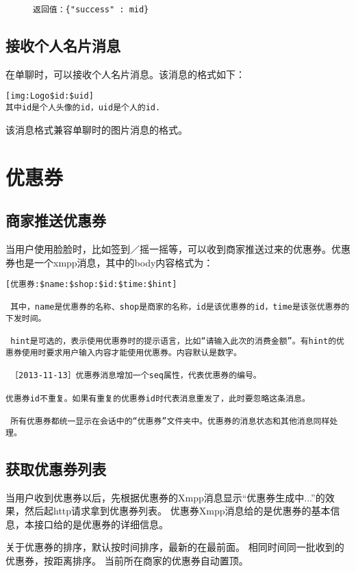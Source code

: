 \begin{figure}[H]
\begin{verbatim}
返回值：{"success" : mid}
\end{verbatim}
\end{figure}


\subsection{接收个人名片消息}
在单聊时，可以接收个人名片消息。该消息的格式如下：
\begin{verbatim}
[img:Logo$id:$uid]
其中id是个人头像的id，uid是个人的id.
\end{verbatim}
该消息格式兼容单聊时的图片消息的格式。


\section{优惠券}

\subsection{商家推送优惠券}
当用户使用脸脸时，比如签到／摇一摇等，可以收到商家推送过来的优惠券。优惠券也是一个xmpp消息，其中的body内容格式为：

\begin{verbatim}
[优惠券:$name:$shop:$id:$time:$hint]

 其中，name是优惠券的名称、shop是商家的名称，id是该优惠券的id，time是该张优惠券的下发时间。
 
 hint是可选的，表示使用优惠券时的提示语言，比如“请输入此次的消费金额”。有hint的优惠券使用时要求用户输入内容才能使用优惠券。内容默认是数字。
 
 ［2013-11-13］优惠券消息增加一个seq属性，代表优惠券的编号。
 
优惠券id不重复。如果有重复的优惠券id时代表消息重发了，此时要忽略这条消息。
 
 所有优惠券都统一显示在会话中的“优惠券”文件夹中。优惠券的消息状态和其他消息同样处理。
\end{verbatim}


\subsection{获取优惠券列表}
当用户收到优惠券以后，先根据优惠券的Xmpp消息显示“优惠券生成中...”的效果，然后起http请求拿到优惠券列表。
优惠券Xmpp消息给的是优惠券的基本信息，本接口给的是优惠券的详细信息。

关于优惠券的排序，默认按时间排序，最新的在最前面。
相同时间同一批收到的优惠券，按距离排序。
当前所在商家的优惠券自动置顶。

